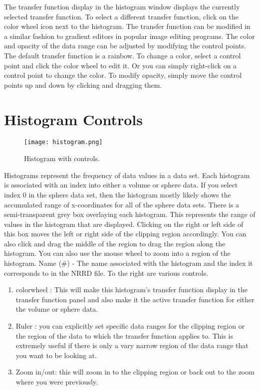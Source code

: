 The transfer function display in the histogram window displays the currently selected transfer function. To select a different transfer function, click on the color wheel icon next to the histogram. The transfer function can be modified in a similar fashion to gradient editors in popular image editing programs. The color and opacity of the data range can be adjusted by modifying the control points. The default transfer function is a rainbow. To change a color, select a control point and click the color wheel to edit it. Or you can simply right-click on a control point to change the color. To modify opacity, simply move the control points up and down by clicking and dragging them.

\section{Histogram Controls}

\begin{figure}[htbp]
  \center
  \texttt{[image: histogram.png]}
  \caption{Histogram with controls.}
  \label{fig:manta_histogram}
\end{figure}

Histograms represent the frequency of data values in a data set. Each histogram is associated with an index into either a volume or sphere data. If you select index 0 in the sphere data set, then the histogram mostly likely shows the accumulated range of x-coordinates for all of the sphere data sets. There is a semi-transparent grey box overlaying each histogram. This represents the range of values in the histogram that are displayed. Clicking on the right or left side of this box moves the left or right side of the clipping region accordingly. You can also click and drag the middle of the region to drag the region along the histogram. You can also use the mouse wheel to zoom into a region of the histogram.
  Name (\#) - The name associated with the histogram and the index it corresponds to in the NRRD file. 
To the right are various controls.

\begin{enumerate}
\item
colorwheel : This will make this histogram's transfer function display in the transfer function panel and also make it the active transfer function for either the volume or sphere data.
\item
Ruler : you can explicitly set specific data ranges for the clipping region or the region of the data to which the transfer function applies to. This is extremely useful if there is only a vary narrow region of the data range that you want to be looking at.
\item
Zoom in/out: this will zoom in to the clipping region or back out to the zoom where you were previously. 
\end{enumerate}

